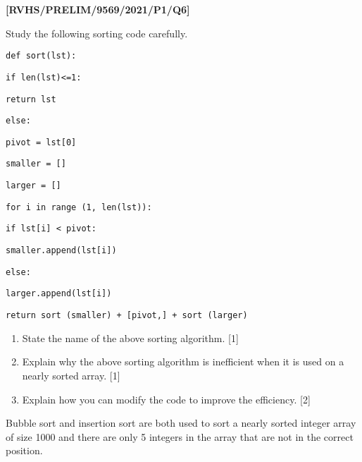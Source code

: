 \item \textbf{{[}RVHS/PRELIM/9569/2021/P1/Q6{]} }

Study the following sorting code carefully. 

\noindent %
\noindent\begin{minipage}[t]{1\columnwidth}%
\texttt{def sort(lst): }

\texttt{\qquad{}if len(lst)<=1: }

\texttt{\qquad{}\qquad{}return lst }

\texttt{\qquad{}else: }

\texttt{\qquad{}\qquad{}pivot = lst{[}0{]} }

\texttt{\qquad{}\qquad{}smaller = {[}{]} }

\texttt{\qquad{}\qquad{}larger = {[}{]} }

\texttt{\qquad{}\qquad{}for i in range (1, len(lst)): }

\texttt{\qquad{}\qquad{}\qquad{}if lst{[}i{]} < pivot: }

\texttt{\qquad{}\qquad{}\qquad{}\qquad{}smaller.append(lst{[}i{]}) }

\texttt{\qquad{}\qquad{}\qquad{}else: }

\texttt{\qquad{}\qquad{}\qquad{}\qquad{}larger.append(lst{[}i{]}) }

\texttt{\qquad{}\qquad{}return sort (smaller) + {[}pivot,{]} + sort
(larger) }%
\end{minipage}
\begin{enumerate}
\item State the name of the above sorting algorithm. \hfill{}{[}1{]}
\item Explain why the above sorting algorithm is inefficient when it is
used on a nearly sorted array. \hfill{} {[}1{]}
\item Explain how you can modify the code to improve the efficiency. \hfill{}{[}2{]}
\end{enumerate}
Bubble sort and insertion sort are both used to sort a nearly sorted
integer array of size 1000 and there are only 5 integers in the array
that are not in the correct position. 

